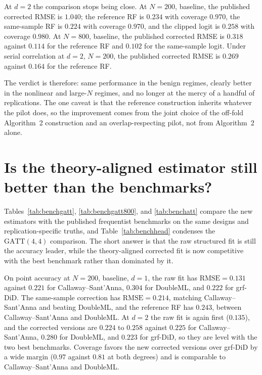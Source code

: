\documentclass[11pt]{article}
\begin{document}
At $d=2$ the comparison stops being close. At $N=200$, baseline, the published corrected
RMSE is $1.040$; the reference RF is $0.234$ with coverage $0.970$, the same-sample RF is
$0.224$ with coverage $0.970$, and the clipped logit is $0.258$ with coverage $0.980$.
At $N=800$, baseline, the published corrected RMSE is $0.318$ against $0.114$ for the
reference RF and $0.102$ for the same-sample logit. Under serial correlation at $d=2$,
$N=200$, the published corrected RMSE is $0.269$ against $0.164$ for the reference RF.

The verdict is therefore: same performance in the benign regimes, clearly better in the
nonlinear and large-$N$ regimes, and no longer at the mercy of a handful of replications.
The one caveat is that the reference construction inherits whatever the pilot does, so
the improvement comes from the joint choice of the off-fold Algorithm~2 construction and
an overlap-respecting pilot, not from Algorithm~2 alone.

\section{Is the theory-aligned estimator still better than the benchmarks?}
\label{sec:benchmarks}

Tables~\ref{tab:benchgatt}, \ref{tab:benchgatt800}, and \ref{tab:benchatt} compare the
new estimators with the published frequentist benchmarks on the same designs and
replication-specific truths, and Table~\ref{tab:benchhead} condenses the
$\mathrm{GATT}(4,4)$ comparison. The short answer is that the raw structured fit is
still the accuracy leader, while the theory-aligned corrected fit is now competitive
with the best benchmark rather than dominated by it.

On point accuracy at $N=200$, baseline, $d=1$, the raw fit has $\mathrm{RMSE}=0.131$
against $0.221$ for Callaway--Sant'Anna, $0.304$ for DoubleML, and $0.222$ for grf-DiD.
The same-sample correction has $\mathrm{RMSE}=0.214$, matching Callaway--Sant'Anna and
beating DoubleML, and the reference RF has $0.243$, between Callaway--Sant'Anna and
DoubleML. At $d=2$ the raw fit is again first ($0.135$), and the corrected versions are
$0.224$ to $0.258$ against $0.225$ for Callaway--Sant'Anna, $0.280$ for DoubleML, and
$0.223$ for grf-DiD, so they are level with the two best benchmarks. Coverage favors
the new corrected versions over grf-DiD by a wide margin ($0.97$ against $0.81$ at both
degrees) and is comparable to Callaway--Sant'Anna and DoubleML.
\end{document}
